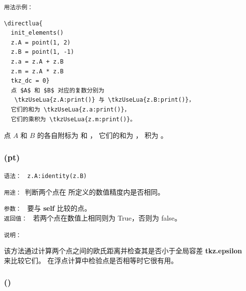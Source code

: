 \medskip
\texttt{用法示例：}

\begin{verbatim}
\directlua{
  init_elements()
  z.A = point(1, 2)
  z.B = point(1, -1)
  z.a = z.A + z.B
  z.m = z.A * z.B
  tkz_dc = 0}
  点 $A$ 和 $B$ 对应的复数分别为
   \tkzUseLua{z.A:print()} 与 \tkzUseLua{z.B:print()}，
  它们的和为 \tkzUseLua{z.a:print()}，
  它们的乘积为 \tkzUseLua{z.m:print()}。
\end{verbatim}


点 $A$ 和 $B$ 的各自附标为
    和 ，
 它们的和为 ，
 积为 。

  \subsubsection{(pt)}
  \label{ssub:identity}

  \medskip
  \texttt{语法： } \verb|z.A:identity(z.B)|

  \medskip
  \texttt{用途： }判断两个点在  所定义的数值精度内是否相同。

  \medskip
  \texttt{参数： } 要与 \textbf{self} 比较的点。\\

  \medskip
  \texttt{返回值： } 若两个点在数值上相同则为 True，否则为 false。\\


  \begin{tkzexample}[latex=.5\textwidth]
  \end{tkzexample}

  \medskip
  \texttt{说明： }

  该方法通过计算两个点之间的欧氏距离并检查其是否小于全局容差 \textbf{tkz.epsilon} 来比较它们。
  在浮点计算中检验点是否相等时它很有用。



  \subsubsection{()}
  \label{ssub:print}

